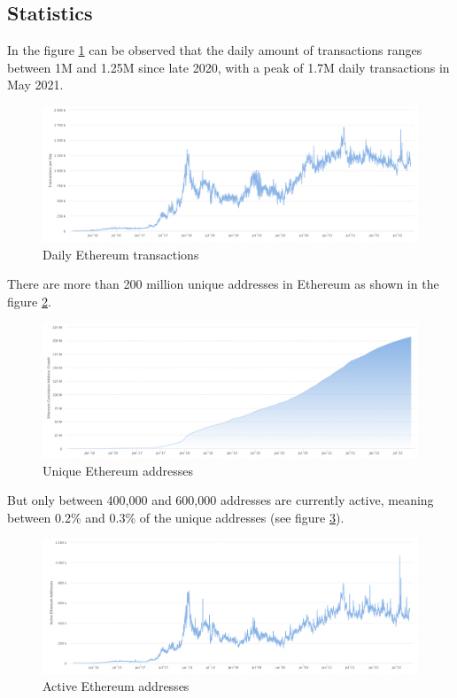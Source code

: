 \documentclass[MSE,Master,english]{twbook}%
\begin{document}
\subsection{Statistics}

In the figure \ref{fig:dailyTxs} can be observed that the daily amount of transactions ranges between 1M and 1.25M since late 2020, with a peak of 1.7M daily transactions in May 2021.
\begin{figure}[H]
  \centering
  \includegraphics[width=\textwidth]{daily_txs.png}
  \caption{Daily Ethereum transactions \cite{etherscan}}
  \label{fig:dailyTxs}
\end{figure}

There are more than 200 million unique addresses in Ethereum as shown in the figure \ref{fig:uniqueAddr}.
\begin{figure}[H]
  \centering
  \includegraphics[width=\textwidth]{unique_addresses.png}
  \caption{Unique Ethereum addresses \cite{etherscan}}
  \label{fig:uniqueAddr}
\end{figure}

But only between 400,000 and 600,000 addresses are currently active, meaning between 0.2\% and 0.3\% of the unique addresses (see figure \ref{fig:activeAddr}).
\begin{figure}[H]
  \centering
  \includegraphics[width=\textwidth]{active_addresses.png}
  \caption{Active Ethereum addresses \cite{etherscan}}
  \label{fig:activeAddr}
\end{figure}
\end{document}
